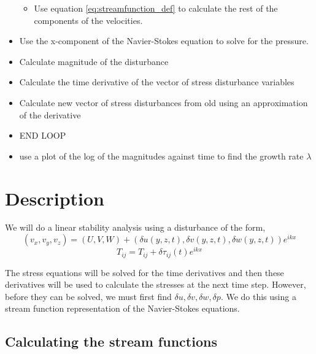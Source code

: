\documentclass[12pt,a4paper]{article}
\newcommand{\su}{\delta u}
\newcommand{\sv}{\delta v}
\newcommand{\sw}{\delta w}
\newcommand{\spr}{\delta p}
\begin{document}
\begin{itemize}
\begin{itemize}
	    \item Use equation \ref{eq:streamfunction_def} to calculate the rest of the components of the velocities.
	\end{itemize}
    \item Use the x-component of the Navier-Stokes equation to solve for the pressure.
    \item Calculate magnitude of the disturbance
    \item Calculate the time derivative of the vector of stress disturbance variables 
    \item Calculate new vector of stress disturbances from old using an approximation of the derivative
    \item END LOOP
    \item use a plot of the log of the magnitudes against time to find the growth rate $\lambda$ 
\end{itemize}

\section{Description}

We will do a linear stability analysis using a disturbance of the form, 
\begin{equation}
    (v_{x}, v_{y}, v_{z}) = (U,V,W) + (\su(y,z,t), \sv(y,z,t), \sw(y,z,t))e^{ikx}
\end{equation}
\begin{equation}
    T_{ij} = T_{ij} + \delta \tau_{ij}(t) e^{ikx} 
\end{equation}

The stress equations will be solved for the time derivatives and then these derivatives will be used to calculate the stresses at the next time step. However, before they can be solved, we must first find $\su,\sv,\sw,\spr$.  We do this using a stream function representation of the Navier-Stokes equations.

\subsection{Calculating the stream functions}
\end{document}
